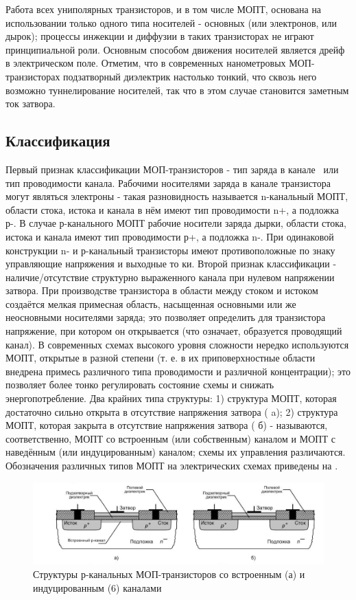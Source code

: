 \documentclass[a4paper,14pt]{article}
\begin{document}
Работа всех униполярных транзисторов, и в том числе МОПТ, основана
на использовании только одного типа носителей - основных (или электронов,
или дырок); процессы инжекции и диффузии в таких транзисторах не играют
принципиальной роли. Основным способом движения носителей является
дрейф в электрическом поле. Отметим, что в современных нанометровых
МОП-транзисторах подзатворный диэлектрик настолько тонкий, что сквозь
него возможно туннелирование носителей, так что в этом случае становится
заметным ток затвора.

\subsection{Классификация}

Первый признак классификации МОП-транзисторов - тип заряда в канале~
или тип проводимости канала. Рабочими носителями заряда в канале
транзистора могут являться электроны - такая разновидность называется
n-канальный МОПТ, области стока, истока и канала в нём имеют тип проводимости
n+, а подложка р-. В случае р-канального МОПТ рабочие носители
заряда дырки, области стока, истока и канала имеют тип проводимости р+,
а подложка n-. При одинаковой конструкции n- и р-канальный транзисторы
имеют противоположные по знаку управляющие напряжения и выходные то ки.
Второй признак классификации - наличие/отсутствие структурно выраженного
канала при нулевом напряжении затвора. При производстве транзистора
в области между стоком и истоком создаётся мелкая примесная область,
насыщенная основными или же неосновными носителями заряда; это
позволяет определить для транзистора напряжение, при котором он открывается
(что означает, образуется проводящий канал). В современных схемах
высокого уровня сложности нередко используются МОПТ, открытые в разной
степени (т. е. в их приповерхностные области внедрена примесь различного
типа проводимости и различной концентрации); это позволяет более
тонко регулировать состояние схемы и снижать энергопотребление. Два
крайних типа структуры: 1) структура МОПТ, которая достаточно сильно открыта
в отсутствие напряжения затвора ( a); 2) структура МОПТ, которая
закрыта в отсутствие напряжения затвора ( б) - называются, соответственно,
МОПТ со встроенным (или собственным) каналом и МОПТ с
наведённым (или индуцированным) каналом; схемы их управления различаются.
Обозначения различных типов МОПТ на электрических схемах приведены
на .

\begin{figure}
	\centering
	\includegraphics[width=\linewidth]{image/Teor_MOP_1}
	\caption{Структуры р-канальных МОП-транзисторов со встроенным (а) и индуцированным (6) каналами}
	\label{fig:teormop1}
\end{figure}
\end{document}
